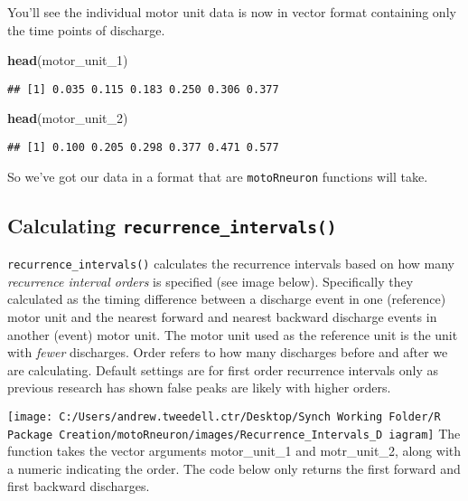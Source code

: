 \documentclass[]{article}
\newenvironment{Shaded}{\begin{snugshade}}{\end{snugshade}}
\newcommand{\KeywordTok}[1]{\textcolor[rgb]{0.13,0.29,0.53}{\textbf{#1}}}
\newcommand{\DecValTok}[1]{\textcolor[rgb]{0.00,0.00,0.81}{#1}}
\newcommand{\NormalTok}[1]{#1}
\begin{document}
You'll see the individual motor unit data is now in vector format
containing only the time points of discharge.

\begin{Shaded}
\begin{Highlighting}[]
\KeywordTok{head}\NormalTok{(motor_unit_}\DecValTok{1}\NormalTok{)}
\end{Highlighting}
\end{Shaded}

\begin{verbatim}
## [1] 0.035 0.115 0.183 0.250 0.306 0.377
\end{verbatim}

\begin{Shaded}
\begin{Highlighting}[]
\KeywordTok{head}\NormalTok{(motor_unit_}\DecValTok{2}\NormalTok{)}
\end{Highlighting}
\end{Shaded}

\begin{verbatim}
## [1] 0.100 0.205 0.298 0.377 0.471 0.577
\end{verbatim}

So we've got our data in a format that are \texttt{motoRneuron}
functions will take.

\subsection{\texorpdfstring{Calculating
\texttt{recurrence\_intervals()}}{Calculating recurrence\_intervals()}}\label{calculating-recurrence_intervals}

\texttt{recurrence\_intervals()} calculates the recurrence intervals
based on how many \emph{recurrence interval orders} is specified (see
image below). Specifically they calculated as the timing difference
between a discharge event in one (reference) motor unit and the nearest
forward and nearest backward discharge events in another (event) motor
unit. The motor unit used as the reference unit is the unit with
\emph{fewer} discharges. Order refers to how many discharges before and
after we are calculating. Default settings are for first order
recurrence intervals only as previous research has shown false peaks are
likely with higher orders.

\texttt{[image: C:/Users/andrew.tweedell.ctr/Desktop/Synch Working Folder/R Package Creation/motoRneuron/images/Recurrence\_Intervals\_D iagram]}
The function takes the vector arguments motor\_unit\_1 and
motr\_unit\_2, along with a numeric indicating the order. The code below
only returns the first forward and first backward discharges.
\end{document}

